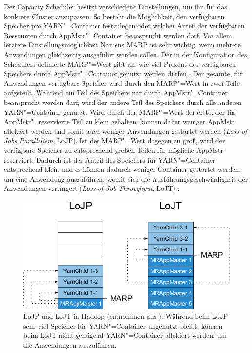Der Capacity Scheduler besitzt verschiedene Einstellungen, um ihn für das konkrete Cluster anzupassen.
So besteht \zB die Möglichkeit, den verfügbaren Speicher pro YARN"=Container festzulegen oder welcher Anteil der verfügbaren Ressourcen durch \gls{AppMstr}"=Container beansprucht werden darf.
Vor allem letztere Einstellungsmöglichkeit Namens \gls{MARP} ist sehr wichtig, wenn mehrere Anwendungen gleichzeitig ausgeführt werden sollen.
Der in der Konfiguration des Schedulers definierte \gls{MARP}"=Wert gibt an, wie viel Prozent des verfügbaren Speichers durch \gls{AppMstr}"=Container genutzt werden dürfen \cite{HadoopCapScheduler271}.
Der gesamte, für Anwendungen verfügbare Speicher wird durch den \gls{MARP}"=Wert in zwei Teile aufgeteilt.
Während ein Teil des Speichers nur durch \gls{AppMstr}"=Container beansprucht werden darf, wird der andere Teil des Speichers durch alle anderen YARN"=Container genutzt.
Wird durch den \gls{MARP}"=Wert der erste, der für \gls{AppMstr}"=reservierte Teil zu klein gehalten, können daher weniger \gls{AppMstr} allokiert werden und somit auch weniger Anwendungen gestartet werden (\emph{Loss of Jobs Parallelism}, LoJP).
Ist der \gls{MARP}"=Wert dagegen zu groß, wird der verfügbare Speicher zu entsprechend großen Teilen für mögliche \gls{AppMstr} reserviert.
Dadurch ist der Anteil des Speichers für YARN"=Container entsprechend klein und es können dadurch weniger Container gestartet werden, um eine Anwendung auszuführen, womit sich die Ausführungsgeschwindigkeit der Anwendungen verringert (\emph{Loss of Job Throughput}, LoJT) \cite{Zhang2016}:

\begin{figure}[h]
    \includegraphics{./resources/marpValue.pdf}
    \caption[LoJP und LoJT in Hadoop]
    {LoJP und LoJT in Hadoop (entnommen aus \cite{Zhang2016}).
        Während beim LoJP sehr viel Speicher für YARN"=Container ungenutzt bleibt, können beim LoJT nicht genügend YARN"=Container allokiert werden, um die Anwendungen auszuführen.}
    \label{fig:marpValue}
\end{figure}

